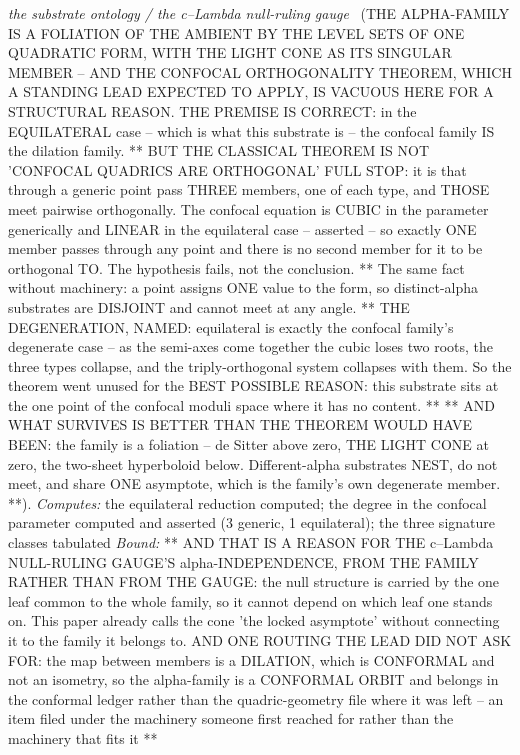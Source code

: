 \begin{description}
\textit{the substrate ontology / the c--Lambda null-ruling gauge} \ (THE ALPHA-FAMILY IS A FOLIATION OF THE AMBIENT BY THE LEVEL SETS OF ONE QUADRATIC FORM, WITH THE LIGHT CONE AS ITS SINGULAR MEMBER -- AND THE CONFOCAL ORTHOGONALITY THEOREM, WHICH A STANDING LEAD EXPECTED TO APPLY, IS VACUOUS HERE FOR A STRUCTURAL REASON. THE PREMISE IS CORRECT: in the EQUILATERAL case -- which is what this substrate is -- the confocal family IS the dilation family. ** BUT THE CLASSICAL THEOREM IS NOT 'CONFOCAL QUADRICS ARE ORTHOGONAL' FULL STOP: it is that through a generic point pass THREE members, one of each type, and THOSE meet pairwise orthogonally. The confocal equation is CUBIC in the parameter generically and LINEAR in the equilateral case -- asserted -- so exactly ONE member passes through any point and there is no second member for it to be orthogonal TO. The hypothesis fails, not the conclusion. ** The same fact without machinery: a point assigns ONE value to the form, so distinct-alpha substrates are DISJOINT and cannot meet at any angle. ** THE DEGENERATION, NAMED: equilateral is exactly the confocal family's degenerate case -- as the semi-axes come together the cubic loses two roots, the three types collapse, and the triply-orthogonal system collapses with them. So the theorem went unused for the BEST POSSIBLE REASON: this substrate sits at the one point of the confocal moduli space where it has no content. ** ** AND WHAT SURVIVES IS BETTER THAN THE THEOREM WOULD HAVE BEEN: the family is a foliation -- de Sitter above zero, THE LIGHT CONE at zero, the two-sheet hyperboloid below. Different-alpha substrates NEST, do not meet, and share ONE asymptote, which is the family's own degenerate member. **). 
\emph{Computes:} the equilateral reduction computed; the degree in the confocal parameter computed and asserted (3 generic, 1 equilateral); the three signature classes tabulated
 \emph{Bound:} ** AND THAT IS A REASON FOR THE c--Lambda NULL-RULING GAUGE'S alpha-INDEPENDENCE, FROM THE FAMILY RATHER THAN FROM THE GAUGE: the null structure is carried by the one leaf common to the whole family, so it cannot depend on which leaf one stands on. This paper already calls the cone 'the locked asymptote' without connecting it to the family it belongs to. AND ONE ROUTING THE LEAD DID NOT ASK FOR: the map between members is a DILATION, which is CONFORMAL and not an isometry, so the alpha-family is a CONFORMAL ORBIT and belongs in the conformal ledger rather than the quadric-geometry file where it was left -- an item filed under the machinery someone first reached for rather than the machinery that fits it **

\end{description}
